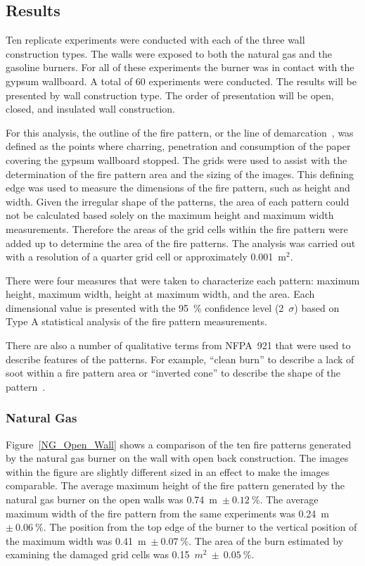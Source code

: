 \documentclass[twoside]{uocthesis}
\begin{document}
{\subsection{Results}

Ten replicate experiments were conducted with each of the three wall construction types.  The walls were exposed to both the natural gas and the gasoline burners.  For all of these experiments the burner was in contact with the gypsum wallboard.  A total of 60 experiments were conducted.  The results will be presented by wall construction type.  The order of presentation will be open, closed, and insulated wall construction.  

For this analysis, the outline of the fire pattern, or the line of demarcation~\cite{NFPA:921}, was defined as the points where charring, penetration and consumption of the paper covering the gypsum wallboard stopped. The grids were used to assist with the determination of the fire pattern area and the sizing of the images. This defining edge was used to measure the dimensions of the fire pattern, such as height and width. Given the irregular shape of the patterns, the area of each pattern could not be calculated based solely on the maximum height and maximum width measurements. Therefore the areas of the grid cells within the fire pattern were added up to determine the area of the fire patterns.  The analysis was carried out with a resolution of a quarter grid cell or approximately 0.001~m$^2$. 

There were four measures that were taken to characterize each pattern: maximum height, maximum width, height at maximum width, and the area.  Each dimensional value is presented with the 95~\% confidence level (2~$\sigma$) based on Type A statistical analysis of the fire pattern measurements. 

There are also a number of qualitative terms from NFPA~921 that were used to describe features of the patterns.  For example, ``clean burn'' to describe a lack of soot within a fire pattern area or ``inverted cone'' to describe the shape of the pattern~\cite{NFPA:921}.      

\subsubsection{Natural Gas}

Figure~\ref{NG_Open_Wall} shows a comparison of the ten fire patterns generated by the natural gas burner on the wall with open back construction.  The images within the figure are slightly different sized in an effect to make the images comparable.
The average maximum height of the fire pattern generated by the natural gas burner on the open walls was 0.74~m~$\pm~0.12~\%$.  The average maximum width of the fire pattern from the same experiments was 0.24~m~$\pm~0.06~\%$.  The position from the top edge of the burner to the vertical position of the maximum width was 0.41~m~$\pm~0.07~\%$. The area of the burn estimated by examining the damaged grid cells was 0.15~$m^2~\pm~0.05~\%$.  

}
\end{document}
